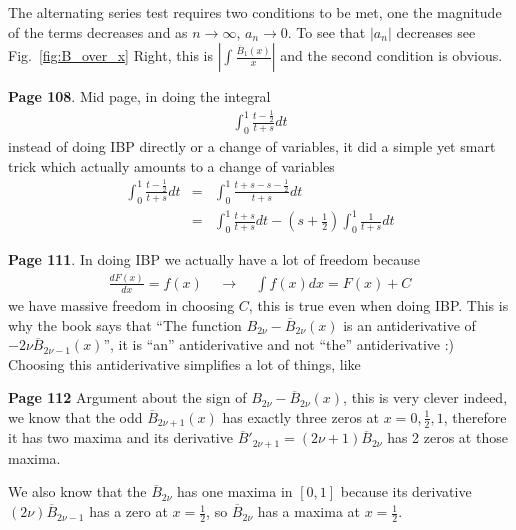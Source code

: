 \documentclass[aps,preprint,preprintnumbers,nofootinbib,showpacs,prd]{revtex4-1}
\newcommand{\nbea}{\begin{eqnarray*}}
\newcommand{\neea}{\end{eqnarray*}}
\begin{document}
The alternating series test requires two conditions to be met, one the magnitude of the terms decreases and as $n\to \infty$, $a_n \to 0$. To see that $|a_n|$ decreases see Fig.~\ref{fig:B_over_x} Right, this is $ \left|\int\frac{\overline{B}_1(x)}{x}\right|$ and the second condition is obvious.

{\bf Page 108}. Mid page, in doing the integral
%
\nbea
\int_0^1 \frac{t - \frac{1}{2}}{t + s} dt
\neea
%
instead of doing IBP directly or a change of variables, it did a simple yet smart trick which actually amounts to a change of variables
%
\nbea
\int_0^1 \frac{t - \frac{1}{2}}{t + s} dt & = & \int_0^1 \frac{t +s - s - \frac{1}{2}}{t + s} dt \\
& = & \int_0^1 \frac{t + s}{t + s} dt - (s + \frac{1}{2})\int_0^1 \frac{1}{t + s} dt
\neea
%

{\bf Page 111}. In doing IBP we actually have a lot of freedom because
%
\nbea
\frac{dF(x)}{dx} = f(x) ~~~~~\longrightarrow ~~~~~ \int f(x) dx = F(x) + C
\neea
%
we have massive freedom in choosing $C$, this is true even when doing IBP. This is why the book says that ``The function $B_{2\nu} - \overline{B}_{2\nu}(x)$ is an antiderivative of $-2\nu\overline{B}_{2\nu-1}(x)$'', it is ``an'' antiderivative and not ``the'' antiderivative :) Choosing this antiderivative simplifies a lot of things, like

{\bf Page 112} Argument about the sign of $B_{2\nu} - \overline{B}_{2\nu}(x)$, this is very clever indeed, we know that the odd $\overline{B}_{2\nu+1}(x)$ has exactly three zeros at $x = 0,\frac{1}{2},1$, therefore it has two maxima and its derivative $\overline{B}'_{2\nu+1} = (2\nu + 1)\overline{B}_{2\nu}$ has 2 zeros at those maxima.

We also know that the $\overline{B}_{2\nu}$ has one maxima in $[0,1]$ because its derivative $(2\nu)\overline{B}_{2\nu - 1}$ has a zero at $x=\frac{1}{2}$, so $\overline{B}_{2\nu}$ has a maxima at $x = \frac{1}{2}$.
\end{document}
